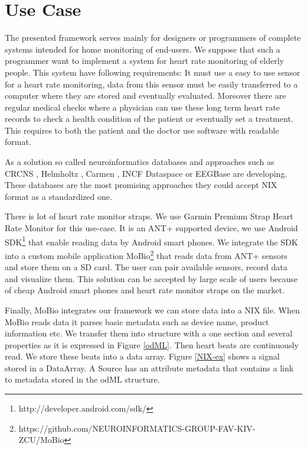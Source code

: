 \documentclass[conference]{IEEEconf}
\begin{document}
\section{Use Case}\label{sec:use-case}

The presented framework serves mainly for designers or programmers of complete systems intended for home monitoring of end-users. We suppose that such a programmer want to implement a system for heart rate monitoring of elderly people. This system have following requirements: It must use a easy to use sensor for a heart rate monitoring, data from this sensor must be easily transferred to a computer where they are stored and eventually evaluated. Moreover there are regular medical checks where a physician can use these long term heart rate records to check a health condition of the patient or eventually set a treatment. This requires to both the patient and the doctor use software with readable format. 

As a solution so called neuroinformatics databases and approaches such as CRCNS \cite{CRCNS}, Helmholtz \cite{10.3389/conf.fninf.2013.09.00025}, Carmen \cite{fgibson:Watson2007},  INCF Dataspace \cite{dataspace} or EEGBase \cite{ISI:000306821100004} are developing. These databases are the most promising approaches they could accept NIX format as a standardized one.

There is lot of heart rate monitor straps. We use Garmin Premium Strap Heart Rate Monitor for this use-case. It is an ANT+ supported device, we use Android SDK\footnote{http://developer.android.com/sdk/} that enable reading data by Android smart phones. We integrate the SDK into a custom mobile application MoBio\footnote{https://github.com/NEUROINFORMATICS-GROUP-FAV-KIV-ZCU/MoBio} that reads data from ANT+ sensors and store them on a SD card. The user can pair available sensors, record data and visualize them. This solution can be accepted by large scale of users because of cheap Android smart phones and heart rate monitor straps on the market.

Finally, MoBio integrates our framework we can store data into a NIX file. When MoBio reads data it parses basic metadata such as device name, product information etc. We transfer them into structure with a one section and several properties as it is expressed in Figure \ref{odML}. Then heart beats are continuously read. We store these beats into a data array. Figure \ref{NIX-ex} shows a signal stored in a DataArray. A Source has an attribute metadata that contains a link to metadata stored in the odML structure.
\end{document}
